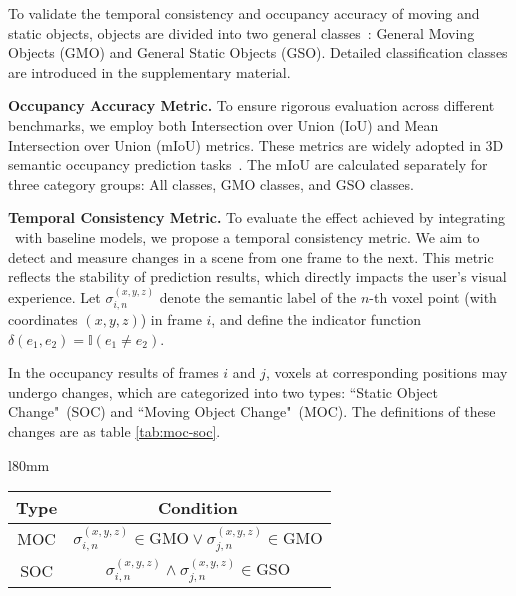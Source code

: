 To validate the temporal consistency and occupancy accuracy of moving and static objects, objects are divided into two general classes~\cite{Cam4docc}: General Moving Objects (GMO) and General Static Objects (GSO). Detailed classification classes are introduced in the supplementary material.

\noindent\textbf{Occupancy Accuracy Metric.} To ensure rigorous evaluation across different benchmarks, we employ both Intersection over Union (IoU) and Mean Intersection over Union (mIoU) metrics. These metrics are widely adopted in 3D semantic occupancy prediction tasks~\cite{PASCAL, Microsoft_COCO, Cityscapes_dataset, Mask_R_CNN}. The mIoU are calculated separately for three category groups: All classes, GMO classes, and GSO classes.

\noindent\textbf{Temporal Consistency Metric.} \label{para:consistency_metric} To evaluate the effect achieved by integrating \ours\ with baseline models, we propose a temporal consistency metric. We aim to detect and measure changes in a scene from one frame to the next. This metric reflects the stability of prediction results, which directly impacts the user's visual experience. Let $\sigma_{i,n}^{(x,y,z)}$ denote the semantic label of the $n$-th voxel point (with coordinates $(x,y,z)$) in frame $i$, and define the indicator function $\delta(e_1,e_2) = \mathbb{I}(e_1 \neq e_2)$. 

In the occupancy results of frames $i$ and $j$, voxels at corresponding positions may undergo changes, which are categorized into two types: ``Static Object Change"~(SOC) and ``Moving Object Change"~(MOC). The definitions of these changes are as table \ref{tab:moc-soc}.

\begin{wrapfigure}[7]{l}{80mm}
\centering
\captionsetup{type=table}
    \begin{tabular}{c|c}
    \toprule
    \textbf{Type} & \textbf{Condition} \\  
    \midrule
    MOC & $\sigma_{i,n}^{(x,y,z)} \in \text{GMO} \lor \sigma_{j,n}^{(x,y,z)} \in \text{GMO}$ \\
    SOC & $\sigma_{i,n}^{(x,y,z)} \wedge \sigma_{j,n}^{(x,y,z)} \in \text{GSO}$ \\  
    \bottomrule
    \end{tabular}
    \vspace{8pt}
    \caption{Definition of MOC and SOC. $N_{mc}$/$N_{sc}$ denote the number of MOC/SOC voxels, respectively.}
    \label{tab:moc-soc}
\end{wrapfigure}

